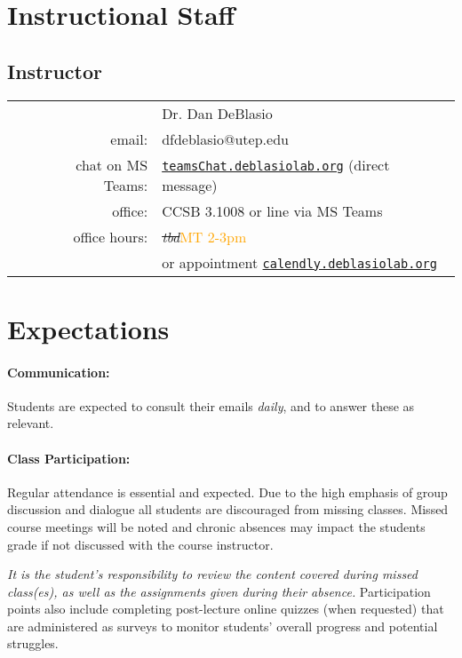 \documentclass[12pt]{scrartcl}
\newcommand{\change}[2]{\sout{#1}\xspace\textcolor{orange}{#2}}
\begin{document}
\section{Instructional Staff}

\subsection{Instructor}
\begin{tabular}{lrl}
& & Dr. Dan DeBlasio  \\
 & email: & dfdeblasio@utep.edu\\
 & chat on MS Teams: &  \href{http://teamsChat.deblasiolab.org}{\texttt{teamsChat.deblasiolab.org}} (direct message)\\
 & office: & CCSB 3.1008 or line via MS Teams\\
 & office hours: & \change{\emph{tbd}}{MT 2-3pm}\\
 & & or appointment \href{http://calendly.deblasiolab.org}{\texttt{calendly.deblasiolab.org}}\\
\end{tabular}


\section{Expectations}

\paragraph{Communication:} Students are expected to consult their emails \textit{daily}, and to answer these as relevant. 

\paragraph{Class Participation:} 
Regular attendance is essential and expected. 
Due to the high emphasis of group discussion and dialogue all students are discouraged from missing classes. 
Missed course meetings will be noted and chronic absences may impact the students grade if not discussed with the course instructor.

\textit{It is the student's responsibility to review the content covered during missed class(es), as well as the assignments given during their absence.}
Participation points also include completing post-lecture online quizzes (when requested) that are administered as surveys to monitor students’ overall progress and potential struggles.
\end{document}
